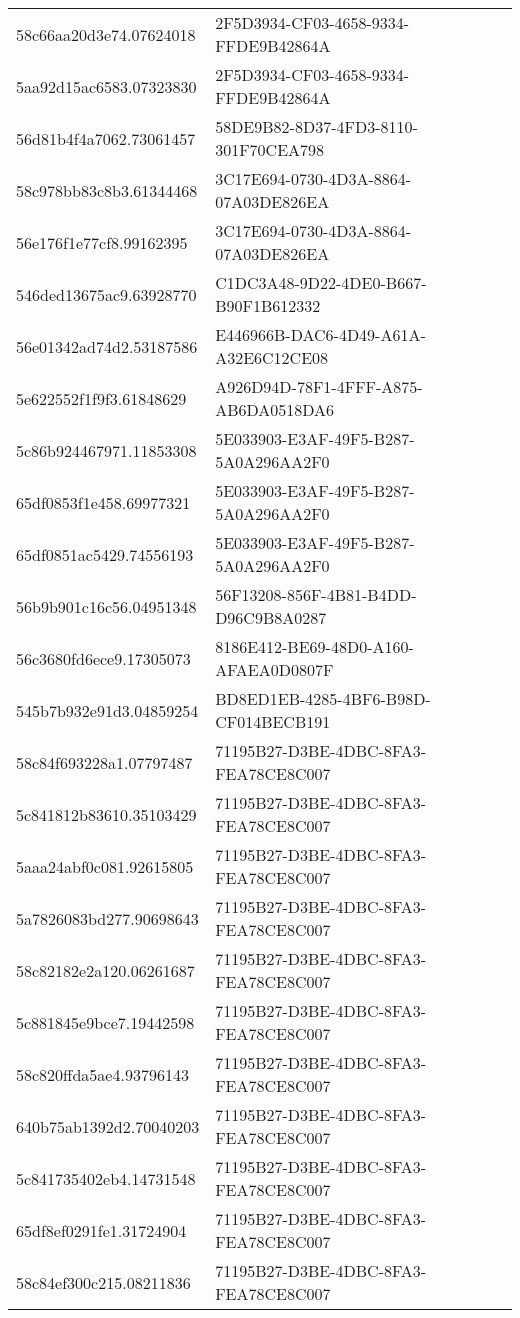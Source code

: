 \begin{tabular}{ll}
58c66aa20d3e74.07624018 & 2F5D3934-CF03-4658-9334-FFDE9B42864A \\
5aa92d15ac6583.07323830 & 2F5D3934-CF03-4658-9334-FFDE9B42864A \\
56d81b4f4a7062.73061457 & 58DE9B82-8D37-4FD3-8110-301F70CEA798 \\
58c978bb83c8b3.61344468 & 3C17E694-0730-4D3A-8864-07A03DE826EA \\
56e176f1e77cf8.99162395 & 3C17E694-0730-4D3A-8864-07A03DE826EA \\
546ded13675ac9.63928770 & C1DC3A48-9D22-4DE0-B667-B90F1B612332 \\
56e01342ad74d2.53187586 & E446966B-DAC6-4D49-A61A-A32E6C12CE08 \\
5e622552f1f9f3.61848629 & A926D94D-78F1-4FFF-A875-AB6DA0518DA6 \\
5c86b924467971.11853308 & 5E033903-E3AF-49F5-B287-5A0A296AA2F0 \\
65df0853f1e458.69977321 & 5E033903-E3AF-49F5-B287-5A0A296AA2F0 \\
65df0851ac5429.74556193 & 5E033903-E3AF-49F5-B287-5A0A296AA2F0 \\
56b9b901c16c56.04951348 & 56F13208-856F-4B81-B4DD-D96C9B8A0287 \\
56c3680fd6ece9.17305073 & 8186E412-BE69-48D0-A160-AFAEA0D0807F \\
545b7b932e91d3.04859254 & BD8ED1EB-4285-4BF6-B98D-CF014BECB191 \\
58c84f693228a1.07797487 & 71195B27-D3BE-4DBC-8FA3-FEA78CE8C007 \\
5c841812b83610.35103429 & 71195B27-D3BE-4DBC-8FA3-FEA78CE8C007 \\
5aaa24abf0c081.92615805 & 71195B27-D3BE-4DBC-8FA3-FEA78CE8C007 \\
5a7826083bd277.90698643 & 71195B27-D3BE-4DBC-8FA3-FEA78CE8C007 \\
58c82182e2a120.06261687 & 71195B27-D3BE-4DBC-8FA3-FEA78CE8C007 \\
5c881845e9bce7.19442598 & 71195B27-D3BE-4DBC-8FA3-FEA78CE8C007 \\
58c820ffda5ae4.93796143 & 71195B27-D3BE-4DBC-8FA3-FEA78CE8C007 \\
640b75ab1392d2.70040203 & 71195B27-D3BE-4DBC-8FA3-FEA78CE8C007 \\
5c841735402eb4.14731548 & 71195B27-D3BE-4DBC-8FA3-FEA78CE8C007 \\
65df8ef0291fe1.31724904 & 71195B27-D3BE-4DBC-8FA3-FEA78CE8C007 \\
58c84ef300c215.08211836 & 71195B27-D3BE-4DBC-8FA3-FEA78CE8C007 \\

\end{tabular}
